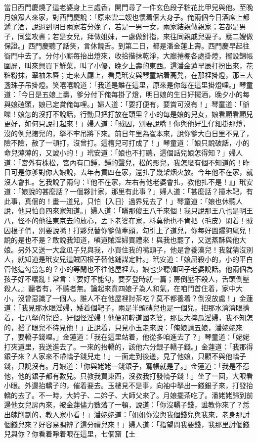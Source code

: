 當日西門慶燒了這老婆身上三處香，開門尋了一件玄色段子粧花比甲兒與他。至晚月娘眾人來家，對西門慶說：「原來雲二嫂也懷着個大身子。俺兩個今日酒席上都遞了酒，說過到明日兩家若分娩了，若是一男一女，兩家結親做親家；若都是男子，同堂攻書；若是女兒，拜做姐妹，一處做針指，來往同親戚兒耍子。應二嫂做保證。」西門慶聽了話笑，言休饒舌。到第二日，都是潘金蓮上壽。西門慶早起往衙門中去了。分付小廝每抬出燈來，收拾揩抹乾淨，大廳捲棚各處掛燈，擺設錦帳圍屏，叫來興買下鮮菓，叫了小優，晚夕上壽的東西。這潘金蓮早辰打扮出來，花粧粉抹，翠袖朱唇；走來大廳上，看見玳安與琴童站着高凳，在那裡掛燈，那三大盞珠子吊掛燈。笑嘻嘻說道：「我道是誰在這里，原來是你每在這里掛燈哩。」琴童道：「今日是五娘上壽，爹分付下俺每掛了燈，明日娘的生日好擺酒，晚夕小的每與娘磕頭，娘已定賞俺每哩。」婦人道：「要打便有，要賞可沒有！」琴童道：「爺嚛！娘怎的沒打不說話，行動只把打放在頭里？小的每是娘的兒女，娘看顧看顧兒更好，如何只說打起來！」婦人道：「賊囚，別要說嘴！你與他好生仔細掛那燈，沒的例兒撦兒的，拏不牢吊將下來。前日年里為崔本來，說你爹大白日里不見了，險不險，赦了一頓打，沒曾打。這槽兒可打成了！」琴童道：「娘只說破話，小的命兒薄薄的，又諕小的！」玳安道：「娘也不打聽，這個話兒娘怎得知？」婦人道：「宮外有株松，宮內有口鍾，鍾的聲兒，松的影兒，我怎麼有個不知道的！昨日可是你爹對你大娘說，去年有賁四在家，還扎了幾架烟火放。今年他不在家，就沒人會扎。乞我說了兩句：『他不在家，左右有他老婆會扎，教他扎不是！』」玳安道：「娘說的甚麼話？一個夥計家，那里有此事？」婦人道：「甚麼話？撞木靶，有此事，真個的！畫一道兒，只怕｛入日｝過界兒去了！」琴童道：「娘也休聽人說，他只怕賁四來家知道。」婦人道：「瞞那傻王八千來個！我只說那王八也是明王八，怪不的他往東京去的放心，丟下老婆在家，料莫他也不肯把〈毛皮〉閑着！賊囚根子們，別要說嘴！打夥兒替你爹做牽頭，勾引上了道兒，你每好圖躧狗尾兒！說的是也不是？敢說我知道，嗔道賊淫婦買禮來！與我也罷了，又送蒸酥與他大娘。另外又送一大盒瓜子兒與我，小買住我的嘴頭子，他是會養漢兒！我就猜沒別人，就知道是玳安兒這賊囚根子替他鋪謀定計。」玳安道：「娘屈殺小的，小的平白管他這勾當怎的？小的等閑也不往他屋裡去，娘也少聽韓回子老婆說話。他兩個為孩子好不嚷亂！常言：『要好不能勾，要歹登時就一篇；房倒壓不殺人，舌頭倒壓殺人。』聽者有，不聽者無。論起來賁四娘子為人和氣，在咱門首住着，家中大小，沒曾惡識了一個人。誰人不在他屋裡討茶吃？莫不都養着？倒沒放處！」金蓮道：「我見那水眼淫婦，矮着個靶子，兩是半頭磚兒也是一個兒，把那水濟濟眼擠着，七八拏的兒舀，好個怪淫婦！他便和韓道國老婆，那長大摔瓜淫婦，我不知怎的，搯了眼兒不待見他！」正說着，只見小玉走來說：「俺娘請五娘，潘姥姥來了，要轎子錢哩。」金蓮道：「我在這里站着，他從多咱進去了？」琴童道：「姥姥打夾道里，我送進去了。一來的抬轎的，該他六分銀子轎子錢。」金蓮道：「我那得銀子來？人家來不帶轎子錢兒走！」一面走到後邊，見了他娘，只顧不與他轎子錢，只說沒有。月娘道：「你與姥姥一錢銀子，寫帳就是了。」金蓮道：「我是不惹他，他的銀子都有數兒。只教我買東西，沒教我打發轎子錢！」坐了一回，大眼看小眼。外邊抬轎子的，催着要去。玉樓見不是事，向袖中拏出一錢銀子來，打發抬轎的去了。不一時，大妗子、二妗子、大師父來了。月娘擺茶吃了。潘姥姥歸到前邊他女兒房內來，被金蓮儘力數落了一頓，說道：「你沒轎子錢，誰教你來了？恁出魄削劃的，教人家小看！」潘姥姥道：「姐姐你沒與我個錢兒與我來，老身那討個錢兒來？好容易賙辨了這分禮兒來！」婦人道：「指望問我要錢，我那里討個錢兒與你？你看着睜着眼在這里，七個窟【土